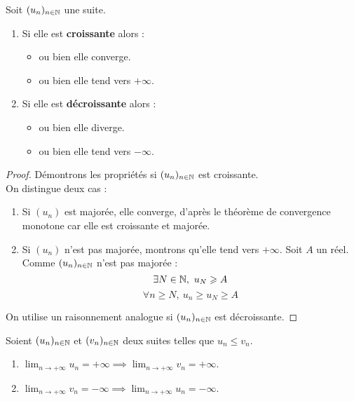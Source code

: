 \begin{theorem}
    Soit $(u_n)_{n \in \mathbb{N}}$ une suite.
    \begin{enumerate}
        \item Si elle est \textbf{croissante} alors :
        \begin{itemize}
                \item ou bien elle converge.
                \item ou bien elle tend vers $+\infty$.
            \end{itemize}
        \item Si elle est \textbf{décroissante} alors :
        \begin{itemize}
                \item ou bien elle diverge.
                \item ou bien elle tend vers $-\infty$.
            \end{itemize}
    \end{enumerate}
\end{theorem}

\begin{proof}
    Démontrons les propriétés si $(u_n)_{n \in \mathbb{N}}$ est croissante. \\ 
    On distingue deux cas :
    \begin{enumerate}
        \item Si $(u_n)$ est majorée, elle converge, d'après le théorème de convergence monotone car elle est croissante et majorée.
        \item Si $(u_n)$ n'est pas majorée, montrons qu'elle tend vers $+\infty$.
        Soit $A$ un réel. Comme $(u_n)_{n \in \mathbb{N}}$ n'est pas majorée :
        \[ \exists N \in \mathbb{N},\ u_N \geqslant A \]
        \[ \forall n \geq N,\ u_n \geq u_N \geq A \]
    \end{enumerate}
    On utilise un raisonnement analogue si $(u_n)_{n \in \mathbb{N}}$ est décroissante.
\end{proof}

\begin{theorem}
   Soient $(u_n)_{n \in \mathbb{N}}$ et $(v_n)_{n \in \mathbb{N}}$ deux suites telles que $u_n \leq v_n$.
   \begin{enumerate}
   	\item $\lim_{n \to +\infty} u_n = +\infty \implies \lim_{n \to +\infty} v_n = +\infty$.
   	\item $\lim_{n \to +\infty} v_n = -\infty \implies \lim_{n \to +\infty} u_n = -\infty$.
   \end{enumerate}
\end{theorem}

